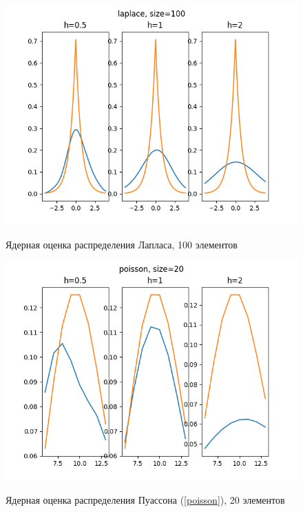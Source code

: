\documentclass[12pt,a4paper]{article}
\begin{document}
			\begin{figure}[htp]
				{\includegraphics[width=1\linewidth]{../plots/laplace_100.png}}
				\caption{Ядерная оценка распределения Лапласа, 100 элементов}
			\end{figure}
			\begin{figure}
				{\includegraphics[width=1\linewidth]{../plots/poisson_20.png}}
				\caption{Ядерная оценка распределения Пуассона (\ref{poisson}), 20 элементов}
			\end{figure}
		
\end{document}
